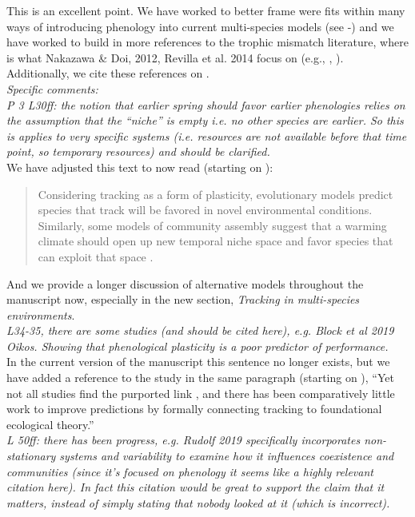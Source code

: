 \documentclass[11pt]{article}
\begin{document}
This is an excellent point. We have worked to better frame were \citet{volkerass} fits within many ways of introducing phenology into current multi-species models (see -) and we have worked to build in more references to the trophic mismatch literature, where is what Nakazawa \& Doi, 2012, Revilla et al. 2014 focus on (e.g., , ). Additionally, we cite these references on .\\

\emph{Specific comments:\\
P 3 L30ff: the notion that earlier spring should favor earlier phenologies relies on the
assumption that the ``niche'' is empty i.e. no other species are earlier. So this is applies to
very specific systems (i.e. resources are not available before that time point, so temporary
resources) and should be clarified.}\\

We have adjusted this text to now read (starting on ):
\begin{quote}
Considering tracking as a form of plasticity, evolutionary models predict species that track will be favored in novel environmental conditions. Similarly, some models of community assembly suggest that a warming climate should open up new temporal niche space and favor species that can exploit that space \citep{gotelli1996,wolkovich:2010fee,Zettlemoyer2019}.
\end{quote}
And we provide a longer discussion of alternative models throughout the manuscript now, especially in the new section, \emph{Tracking in multi-species environments}.\\

\emph{L34-35, there are some studies (and should be cited here), e.g. Block et al 2019 Oikos.
Showing that phenological plasticity is a poor predictor of performance.}\\

In the current version of the manuscript this sentence no longer exists, but we have added a reference to the study in the same paragraph (starting on ), ``Yet not all studies find the purported link \citep[e.g.,][]{block2019}, and there has been comparatively little work to improve predictions by formally connecting tracking to foundational ecological theory.''\\

\emph{L 50ff: there has been progress, e.g. Rudolf 2019 specifically incorporates non-stationary
systems and variability to examine how it influences coexistence and communities (since it's
focused on phenology it seems like a highly relevant citation here). In fact this citation
would be great to support the claim that it matters, instead of simply stating that nobody
looked at it (which is incorrect).}\\
\end{document}
